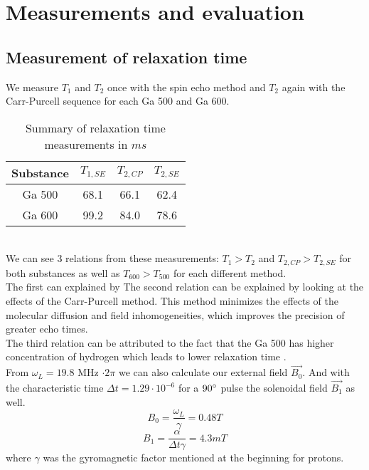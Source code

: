 \section{Measurements and evaluation}\label{measurements-and-evaluation}

\subsection{Measurement of relaxation time}\label{relaxation-time}

We measure $T_1$ and $T_2$ once with the spin echo method and $T_2$ again with the Carr-Purcell sequence for each Ga 500 and Ga 600.
\begin{table}[h!]
\centering
\begin{tabular}{c||c|c|c}
Substance  &  $T_{1,SE}$ & $T_{2,CP}$ & $T_{2,SE}$ \\
\hline
\hline
Ga 500 & 68.1 & 66.1 & 62.4 \\
\hline
Ga 600 & 99.2 & 84.0 & 78.6 \\
\end{tabular}
\caption{Summary of relaxation time measurements in $ms$}
\label{table1}
\end{table}\\
We can see 3 relations from these measurements: $T_{1} > T_{2}$ and $T_{2,CP} > T_{2,SE}$ for both substances as well as $T_{600} > T_{500}$ for each different method.\\
The first can explained by %
The second relation can be explained by looking at the effects of the Carr-Purcell method. This method minimizes the effects of the molecular diffusion and field inhomogeneities, which improves the precision of greater echo times.\\
The third relation can be attributed to the fact that the Ga 500 has higher concentration of hydrogen which leads to lower relaxation time .
\vspace{2mm}\\
From $\omega_L = 19.8$ MHz $\cdot 2\pi$ we can also calculate our external field $\vec{B_0}$. And with the characteristic time $\Delta t = 1.29\cdot 10^{-6}$ for a $90\degree$ pulse the solenoidal field $\vec{B_1}$ as well.
\begin{equation}\label{b_0}
	B_0 = \dfrac{\omega_L}{\gamma} = 0.48 T
\end{equation}
\begin{equation}\label{b_1}
	B_1 = \dfrac{\alpha}{\Delta t \gamma} = 4.3 mT
\end{equation}
where $\gamma$ was the gyromagnetic factor mentioned at the beginning for protons.
